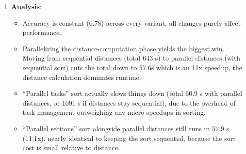 \begin{enumerate}
    \item \textbf{Analysis}:
    \begin{itemize}
        \item Accuracy is constant (0.78) across every variant, all changes purely affect performance.
        \item Parallelizing the distance-computation phase yields the biggest win. Moving from sequential distances (total 643 s) to parallel distances (with sequential sort) cuts the total down to 57.6s which is an 11x speedup, the distance calculation dominates runtime.
        \item “Parallel tasks” sort actually slows things down (total 60.9 s with parallel distances, or 1091 s if distances stay sequential), due to the overhead of task management outweighing any micro-speedups in sorting.
        \item “Parallel sections” sort alongside parallel distances still runs in 57.9 s (11.1x), nearly identical to keeping the sort sequential, because the sort cost is small relative to distance.
    \end{itemize}
\end{enumerate}



